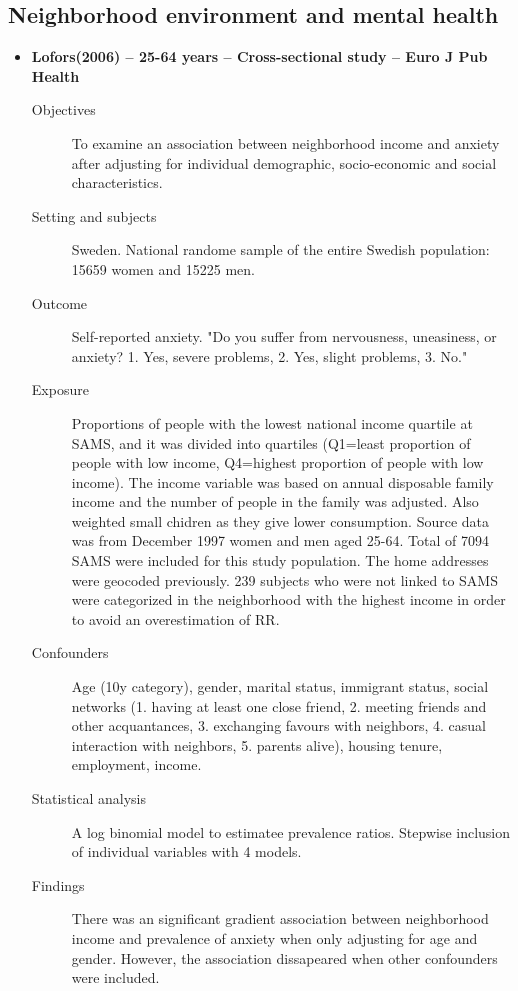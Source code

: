 \documentclass{article}
\begin{document}
\begin{itemize}
\subsection{Neighborhood environment and mental health}
\begin{itemize}
	\item{\bf Lofors(2006) -- 25-64 years -- Cross-sectional study -- Euro J Pub Health} 
		\begin{description}
			\item[Objectives]
				To examine an association between neighborhood income and anxiety after adjusting for individual demographic, socio-economic and social characteristics.
			\item[Setting and subjects] 
				Sweden. National randome sample of the entire Swedish population: 15659 women and 15225 men.
			\item[Outcome]
				Self-reported anxiety. "Do you suffer from nervousness, uneasiness, or anxiety? 1. Yes, severe problems, 2. Yes, slight problems, 3. No."
			\item[Exposure] 
				Proportions of people with the lowest national income quartile at SAMS, and it was divided into quartiles (Q1=least proportion of people with low income, Q4=highest proportion of people with low income). The income variable was based on annual disposable family income and the number of people in the family was adjusted. Also weighted small chidren as they give lower consumption. Source data was from December 1997 women and men aged 25-64. Total of 7094 SAMS were included for this study population. The home addresses were geocoded previously. 239 subjects who were not linked to SAMS were categorized in the neighborhood with the highest income in order to avoid an overestimation of RR.
			\item[Confounders] 
				Age (10y category), gender, marital status, immigrant status, social networks (1. having at least one close friend, 2. meeting friends and other acquantances, 3. exchanging favours with neighbors, 4. casual interaction with neighbors, 5. parents alive), housing tenure, employment, income.
			\item[Statistical analysis] 
				A log binomial model to estimatee prevalence ratios. Stepwise inclusion of individual variables with 4 models.
			\item[Findings] There was an significant gradient association between neighborhood income and prevalence of anxiety when only adjusting for age and gender. However, the association dissapeared when other confounders were included.

\end{description}
\end{itemize}
\end{itemize}
\end{document}
